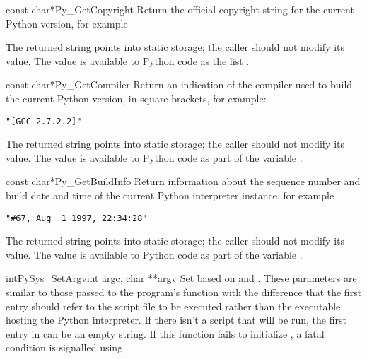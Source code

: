 \documentclass{manual}
\begin{document}
\begin{cfuncdesc}{const char*}{Py_GetCopyright}{}
Return the official copyright string for the current Python version, 
for example


The returned string points into static storage; the caller should not 
modify its value.  The value is available to Python code as the list 
.
\end{cfuncdesc}

\begin{cfuncdesc}{const char*}{Py_GetCompiler}{}
Return an indication of the compiler used to build the current Python 
version, in square brackets, for example:

\begin{verbatim}
"[GCC 2.7.2.2]"
\end{verbatim}

The returned string points into static storage; the caller should not 
modify its value.  The value is available to Python code as part of 
the variable .
\end{cfuncdesc}

\begin{cfuncdesc}{const char*}{Py_GetBuildInfo}{}
Return information about the sequence number and build date and time 
of the current Python interpreter instance, for example

\begin{verbatim}
"#67, Aug  1 1997, 22:34:28"
\end{verbatim}

The returned string points into static storage; the caller should not 
modify its value.  The value is available to Python code as part of 
the variable .
\end{cfuncdesc}

\begin{cfuncdesc}{int}{PySys_SetArgv}{int argc, char **argv}
Set  based on  and .  These
parameters are similar to those passed to the program's
 function with the difference that
the first entry should refer to the script file to be executed rather
than the executable hosting the Python interpreter.  If there isn't a
script that will be run, the first entry in  can be an empty
string.  If this function fails to initialize , a fatal 
condition is signalled using
.
\end{cfuncdesc}
\end{document}
